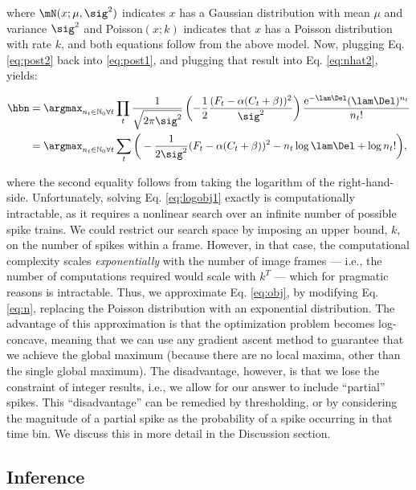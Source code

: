 \noindent where $\mN(x;\mu,\sig^2)$ indicates $x$ has a Gaussian distribution with mean $\mu$ and variance $\sig^2$ and Poisson$(x;k)$ indicates that $x$ has a Poisson distribution with rate $k$, and both equations follow from the above model.  Now, plugging Eq. \eqref{eq:post2} back into \eqref{eq:post1}, and plugging that result into Eq. \eqref{eq:nhat2}, yields:

\begin{subequations}  \label{eq:obj}
\begin{align}
\hbn 	&= \anx \prod_t \frac{1}{\sqrt{2 \pi \sig^2}} \left(-\frac{1}{2}\frac{(F_t - \alpha (C_t + \beta))^2}{\sig^2}\right) \frac{\text{e}^{-\lam\Del} (\lam\Del)^{n_t}}{n_t!}
\label{eq:obj1}\\ &= \anx  \sum_t \bigg( -\frac{1}{2 \sig^2}(F_t - \alpha(C_t + \beta))^2  -  n_t \log \lam \Del + \log n_t! \bigg), \label{eq:logobj1}
\end{align} 
\end{subequations}

\noindent where the second equality follows from taking the logarithm of the right-hand-side.  Unfortunately, solving Eq. \eqref{eq:logobj1} exactly is computationally intractable, as it requires a nonlinear search over an infinite number of  possible spike trains.  We could restrict our search space by imposing an upper bound, $k$, on the number of spikes within a frame.  However, in that case, the computational complexity scales \emph{exponentially} with the number of image frames --- i.e., the number of computations required would scale with $k^T$ --- which for pragmatic reasons is intractable.  Thus, we approximate Eq. \eqref{eq:obj}, by modifying Eq. \eqref{eq:n}, replacing the Poisson distribution with an exponential distribution.  The advantage of this approximation is that the optimization problem becomes log-concave, meaning that we can use any gradient ascent method to guarantee that we achieve the global maximum (because there are no local maxima, other than the single global maximum).  The disadvantage, however, is that we lose the constraint of integer results, i.e., we allow for our answer to include ``partial'' spikes.  This ``disadvantage'' can be remedied by thresholding, or by considering the magnitude of a partial spike as the probability of a spike occurring in that time bin.  We discuss this in more detail in the Discussion section.





\subsection{Inference} \label{sec:inf}

